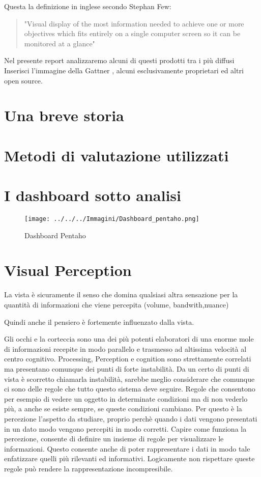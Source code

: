 \documentclass{ium}
\begin{document}
Questa la definizione in inglese secondo Stephan Few:
\begin{quotation}
"Visual display of the most information needed to achieve one or more objectives which fits entirely on a single computer screen so it can be monitored at a glance"
\end{quotation}


Nel presente report analizzaremo alcuni di questi prodotti tra i più diffusi
{Inserisci l'immagine della Gattner} , alcuni esclusivamente proprietari ed altri open source.

\section{Una breve storia}


\section{Metodi di valutazione utilizzati}
\section{I dashboard sotto analisi}
\begin{center}




	\begin{figure*}
	\texttt{[image: ../../../Immagini/Dashboard\_pentaho.png]} 
	\caption{Dashboard Pentaho}

	\end{figure*}
\end{center}

\section{Visual Perception}

La vista è sicuramente il senso che domina qualsiasi altra sensazione per la quantità di informazioni che viene percepita (volume, bandwith,nuance)

Quindi anche il pensiero è fortemente influenzato dalla vista.

Gli occhi e la corteccia sono una dei più potenti elaboratori di una enorme mole di informazioni recepite in modo parallelo e trasmesso ad altissima velocità al centro cognitivo. Processing, Perception e cognition sono strettamente correlati ma presentano comunque dei punti di forte instabilità. Da un certo di punti di vista è scorretto chiamarla instabilità, sarebbe meglio considerare che comunque ci sono delle regole che tutto questo sistema deve seguire. Regole che consentono per esempio di vedere un oggetto in determinate condizioni ma di non vederlo più, a anche se esiste sempre, se queste condizioni cambiano.
Per questo è la percezione l'aspetto da studiare, proprio perchè quando i dati vengono presentati in un dato modo vengono percepiti in modo corretti. Capire come  funziona la percezione, consente di definire un insieme di regole per visualizzare le informazioni. Questo consente anche di poter rappresentare i dati in modo tale enfatizzare quelli più rilevanti ed informativi.
Logicamente non rispettare queste regole può rendere la rappresentazione incompresibile.
\end{document}
